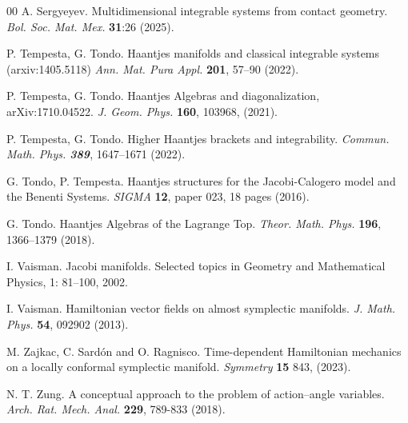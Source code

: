 \documentclass[10pt]{amsart}
\numberwithin{equation}{section}
\newcommand{\tbf}{\textbf}
\theoremstyle{definition}
\begin{document}
\begin{thebibliography}{00}
 A. Sergyeyev. Multidimensional integrable systems from contact
geometry. \textit{Bol. Soc. Mat. Mex.}  \tbf{31}:26 (2025).

 P. Tempesta, G. Tondo. Haantjes manifolds and classical integrable systems (arxiv:1405.5118) \textit{Ann. Mat. Pura Appl.} \tbf{201}, 57–90 (2022).



 P. Tempesta, G. Tondo. Haantjes Algebras and diagonalization, arXiv:1710.04522. \textit{J. Geom. Phys.} \tbf{160}, 103968,  (2021). 

 P. Tempesta, G. Tondo. Higher Haantjes brackets and integrability.  \textit{Commun. Math. Phys. \tbf{389}}, 1647–1671 (2022).


  G. Tondo, P. Tempesta. Haantjes structures for the Jacobi-Calogero model and the Benenti Systems. \textit{SIGMA} \textbf{12}, paper 023, 18 pages (2016).

  G. Tondo. Haantjes Algebras of the Lagrange Top. \textit{Theor. Math. Phys.} \textbf{196}, 1366--1379 (2018).


 I. Vaisman. Jacobi manifolds. Selected topics in Geometry and Mathematical Physics, 1: 81–100, 2002.

 I. Vaisman. Hamiltonian vector fields on almost symplectic manifolds. \textit{J. Math. Phys.} \tbf{54}, 092902 (2013).

 M. Zajkac, C. Sard{\'o}n and O. Ragnisco. Time-dependent Hamiltonian mechanics on a locally conformal symplectic manifold. \textit{Symmetry} \tbf{15} 843, (2023).

 N. T. Zung. A conceptual approach to the problem of action--angle variables. \textit{Arch. Rat. Mech. Anal.} \textbf{229}, 789-833 (2018).

\end{thebibliography}
\end{document}
